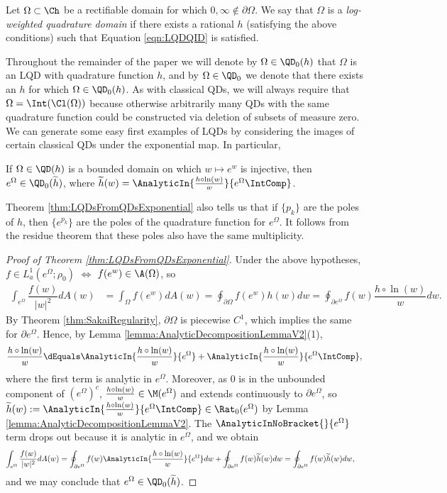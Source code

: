 \documentclass{article}
\numberwithin{equation}{section}
\begin{document}
\begin{definition}
Let $\Omega\subset\Ch$ be a rectifiable domain for which $0,\infty\notin\partial\Omega$. We say that $\Omega$ is a \emph{log-weighted quadrature domain} if there exists a rational $h$ (satisfying the above conditions) such that Equation \ref{eqn:LQDQID} is satisfied.
\end{definition}
Throughout the remainder of the paper we will denote by $\Omega\in\QD_0(h)$ that $\Omega$ is an LQD with quadrature function $h$, and by $\Omega\in\QD_0$ we denote that there exists an $h$ for which $\Omega\in\QD_0(h)$. As with classical QDs, we will always require that $\Omega=\Int(\Cl(\Omega))$ because otherwise arbitrarily many QDs with the same quadrature function could be constructed via deletion of subsets of measure zero. We can generate some easy first examples of LQDs by considering the images of certain classical QDs under the exponential map. In particular, 
\begin{theorem}\label{thm:LQDsFromQDsExponential}
If $\Omega\in\QD(h)$ is a bounded domain on which $w\mapsto e^w$ is injective, then $e^\Omega\in\QD_0(\widetilde{h})$, where $\widetilde{h}(w)=\AnalyticIn{\frac{h\circ\ln(w)}{w}}{e^{\Omega}\IntComp}$.
\end{theorem}
Theorem \ref{thm:LQDsFromQDsExponential} also tells us that if $\{p_k\}$ are the poles of $h$, then $\{e^{p_k}\}$ are the poles of the quadrature function for $e^{\Omega}$. It follows from the residue theorem that these poles also have the same multiplicity.
\begin{proof}[Proof of Theorem \ref{thm:LQDsFromQDsExponential}]
Under the above hypotheses, $f\in L_a^1(e^{\Omega};\rho_0)$ $\iff$ $f(e^w)\in \A(\Omega)$, so
\begin{align*}
    \int_{e^{\Omega}}\dfrac{f(w)}{|w|^2}dA(w)&=\int_{\Omega}f(e^w)dA(w)=\oint_{\partial\Omega}f(e^w)h(w)dw=\oint_{\partial e^{\Omega}}f(w)\dfrac{h\circ\ln(w)}{w}dw.
\end{align*}
By Theorem \ref{thm:SakaiRegularity}, $\partial\Omega$ is piecewise $C^1$, which implies the same for $\partial e^{\Omega}$. Hence, by Lemma \ref{lemma:AnalyticDecompositionLemmaV2}(1),
$$\frac{h\circ\ln(w)}{w}\dEquals\AnalyticIn{\frac{h\circ\ln(w)}{w}}{e^\Omega}+\AnalyticIn{\frac{h\circ\ln(w)}{w}}{e^\Omega\IntComp},$$
where the first term is analytic in $e^{\Omega}$. Moreover, as $0$ is in the unbounded component of $(e^{\Omega})^c$, $\frac{h\circ\ln(w)}{w}\in\M(e^{\Omega})$ and extends continuously to $\partial e^{\Omega}$, so $\widetilde{h}(w):=\AnalyticIn{\frac{h\circ\ln(w)}{w}}{e^{\Omega}\IntComp}\in\Rat_0(e^{\Omega})$ by Lemma \ref{lemma:AnalyticDecompositionLemmaV2}. The $\AnalyticInNoBracket{}{e^\Omega}$ term drops out because it is analytic in $e^\Omega$, and we obtain
\begin{align*}
    \int_{e^{\Omega}}\dfrac{f(w)}{|w|^2}dA(w)&=\oint_{\partial e^{\Omega}}f(w)\AnalyticIn{\frac{h\circ\ln(w)}{w}}{e^\Omega}dw+\oint_{\partial e^{\Omega}}f(w)\widetilde{h}(w)dw=\oint_{\partial e^{\Omega}}f(w)\widetilde{h}(w)dw,
\end{align*}
and we may conclude that $e^{\Omega}\in\QD_0(\widetilde{h})$.
\end{proof}
\end{document}

